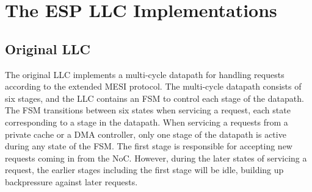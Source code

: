 \documentclass{sig-alternate}
\begin{document}
  
\section{The ESP LLC Implementations}
\label{sec:llcImplementations}
\subsection{Original LLC}
The original LLC implements a multi-cycle datapath for handling requests according to the extended MESI protocol. The multi-cycle datapath consists of six stages, and the LLC contains an FSM to control each stage of the datapath.
The FSM transitions between six states when servicing a request, each state corresponding to a stage in the datapath. 
When servicing a requests from a private cache or a DMA controller, only one stage of the datapath is active during any state of the FSM. The first stage is responsible for accepting 
new requests coming in from the NoC. However, during the later states of servicing a request, the earlier stages including the first stage will be idle, building up backpressure against later requests.
\end{document}
